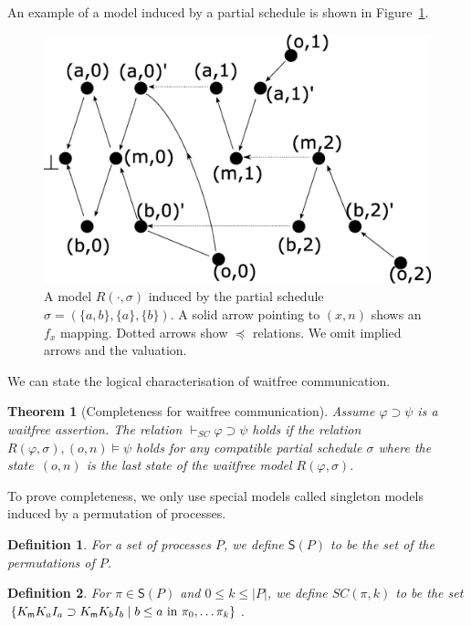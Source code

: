 \documentclass[doctor]{iscs-thesis}
\newcommand{\memory}{{\sf m}}
\newtheorem{definition}{Definition}
\newtheorem{theorem}{Theorem}
\begin{document}
An example of a model induced by a partial schedule is shown in
Figure~\ref{schedulemodel}.
\begin{figure}
\begin{center}
 \includegraphics[scale=0.3]{schedulemodel.eps} 
\end{center}
\caption{A model $R(\cdot, \sigma)$
 induced by the partial schedule $\sigma = \left(\{a,b\}, \{a\}, \{b\}\right)$.
 A solid arrow pointing to $(x,n)$ shows an $f_x$ mapping.  Dotted arrows show $\preceq$ relations.
 We omit implied arrows and the valuation.}
 \label{schedulemodel}
\end{figure}

We can state the logical characterisation of waitfree communication.
\begin{theorem}[Completeness for waitfree communication]
\label{sc-comp}
 Assume $\varphi\supset \psi$ is a waitfree assertion.
 The relation $\vdash_{SC} \varphi\supset\psi$ holds if the relation $R(\varphi, \sigma),
 (o,n) \models \psi$ holds for any compatible partial schedule $\sigma$ where the state~$(o,n)$
 is the last state of the waitfree model $R(\varphi, \sigma)$.
\end{theorem}
To prove completeness, we only use special models called singleton
models induced by a permutation of processes.

\begin{definition}
 For a set of processes $P$, we define $\mathsf S(P)$ to be the set of the permutations of $P$.
\end{definition}

\begin{definition}
 For $\pi\in \mathsf S(P)$ and $0\le k\le |P|$, we define
 $SC(\pi,k)$ to be the set $\{K_\memory K_a I_a\supset K_\memory K_b I_b\mid b\le a\mbox{ in }\pi_0,\ldots \pi_k\}$.
\end{definition}
\end{document}
